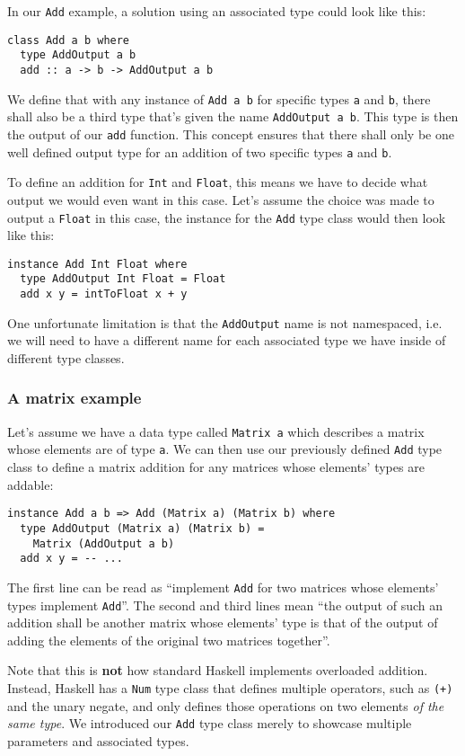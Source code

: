 In our \verb|Add| example, a solution using an associated type could look like this:
\begin{verbatim}
class Add a b where
  type AddOutput a b
  add :: a -> b -> AddOutput a b
\end{verbatim}
We define that with any instance of \verb|Add a b| for specific types \verb|a| and \verb|b|, there shall also be a third type that's given the name \verb|AddOutput a b|. This type is then the output of our \verb|add| function. This concept ensures that there shall only be one well defined output type for an addition of two specific types \verb|a| and \verb|b|.

To define an addition for \verb|Int| and \verb|Float|, this means we have to decide what output we would even want in this case. Let's assume the choice was made to output a \verb|Float| in this case, the instance for the \verb|Add| type class would then look like this:
\begin{verbatim}
instance Add Int Float where
  type AddOutput Int Float = Float
  add x y = intToFloat x + y
\end{verbatim}
One unfortunate limitation is that the \verb|AddOutput| name is not namespaced, i.e. we will need to have a different name for each associated type we have inside of different type classes.

\subsubsection{A matrix example}\label{haskell-matrix}

Let's assume we have a data type called \verb|Matrix a| which describes a matrix whose elements are of type \verb|a|. We can then use our previously defined \verb|Add| type class to define a matrix addition for any matrices whose elements' types are addable:
\begin{verbatim}
instance Add a b => Add (Matrix a) (Matrix b) where
  type AddOutput (Matrix a) (Matrix b) =
    Matrix (AddOutput a b)
  add x y = -- ...
\end{verbatim}
The first line can be read as ``implement \verb|Add| for two matrices whose elements' types implement \verb|Add|''. The second and third lines mean ``the output of such an addition shall be another matrix whose elements' type is that of the output of adding the elements of the original two matrices together''.

Note that this is \textbf{not} how standard Haskell implements overloaded addition. Instead, Haskell has a \verb|Num| type class that defines multiple operators, such as \verb|(+)| and the unary negate, and only defines those operations on two elements \emph{of the same type}. We introduced our \verb|Add| type class merely to showcase multiple parameters and associated types.
